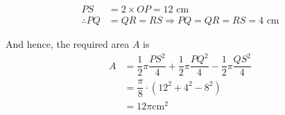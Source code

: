 \begin{solution}
	\begin{align}
		PS &= 2\times OP = \text{12 cm} \\
		\therefore PQ &= QR = RS \Rightarrow PQ = QR = RS = \text{4 cm}
	\end{align}
	
	And hence, the required area $A$ is
	\begin{align}
		A &= \dfrac{1}{2}\pi\dfrac{PS^2}{4} + \dfrac{1}{2}\pi\dfrac{PQ^2}{4} 
		- \dfrac{1}{2}\pi\dfrac{QS^2}{4} \\
		&= \dfrac{\pi}{8}\cdot\left( 12^2 + 4^2 - 8^2\right) \\
		&= 12\pi \text{cm}^2
	\end{align}
\end{solution}
